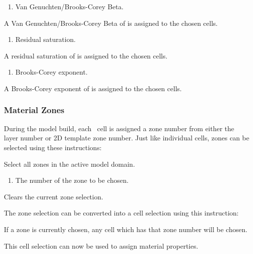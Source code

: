 {
    {
        \squish
        \begin{enumerate}
        \item {}  Van Genuchten/Brooks-Corey Beta.
        \end{enumerate}
          A Van Genuchten/Brooks-Corey Beta of  is assigned to the chosen cells.
    }

    {
        \squish
        \begin{enumerate}
        \item {}  Residual saturation.
        \end{enumerate}
          A residual saturation of  is assigned to the chosen cells.
    }

    {
        \squish
        \begin{enumerate}
        \item {}  Brooks-Corey exponent.
        \end{enumerate}
          A Brooks-Corey exponent of  is assigned to the chosen cells.
    }


\subsubsection{Material Zones}  
During the model build, each \gwf\ cell is assigned a zone number from either the layer number or 2D template zone number. Just like individual cells, zones can be selected using these instructions\label{page:zoneSelect}:

    {Select all zones in the active model domain.
     }

    {
        \squish
        \begin{enumerate}
        \item {}  The number of the zone to be chosen.
        \end{enumerate}
        \squish
    }

    {Clears the current zone selection.
     }

The zone selection can be converted into a cell selection using this instruction:

    {If a zone is currently chosen, any cell which has that zone number will be chosen.
     }

This cell selection can now be used to assign material properties.

}
